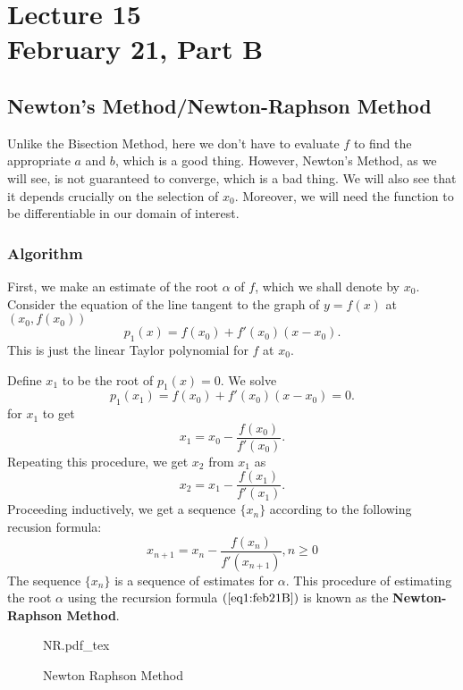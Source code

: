 \chapter*{Lecture 15 \\ February 21, Part B}
\setcounter{chapter}{15}
\setcounter{section}{0}
\setcounter{figure}{0}

\section{Newton's Method/Newton-Raphson Method}

Unlike the Bisection Method, here we don't have to evaluate $f$ to find the appropriate  $a$ and  $b$, which is a good thing. However, Newton's Method, as we will see, is not guaranteed to converge, which is a bad thing. We will also see that it depends crucially on the selection of $x_0$. Moreover, we will need the function to be differentiable in our domain of interest.

\subsection{Algorithm}
First, we make an estimate of the root $\alpha$ of $f$, which we shall denote by  $ x_0$.
Consider the equation of the line tangent to the graph of $y = f(x)$ at $(x_0, f(x_0))$
\[
p_1(x) = f(x_0) + f'(x_0)\left( x-x_0 \right)   
.\] 
This is just the linear Taylor polynomial for $f$ at  $ x_0$.

Define $ x_1$ to be the root of $ p_1(x) = 0$. We solve 
\[
p_1(x_1) = f(x_0) + f'(x_0)(x-x_0) = 0
.\] 
for $ x_1$ to get 
\[
x_1 = x_0 - \frac{f(x_0)}{f'(x_0)}
.\] 
Repeating this procedure, we get $ x_2$ from $ x_1$ as 
\[
x_2 = x_1 - \frac{f(x_1)}{f'(x_1)}
.\] 
Proceeding inductively, we get a sequence $\{x_n\}$ according to the following recusion formula:
\begin{equation}\label{eq1:feb21B}
	 x_{n+1} = x_n - \frac{f(x_n)}{f'(x_{n+1})}, n \geq 0
\end{equation}
The sequence $\{x_n\}$ is a sequence of estimates for  $\alpha$. This procedure of estimating the root $\alpha$ using the recursion formula $\left( \ref{eq1:feb21B} \right) $ is known as the \textbf{Newton-Raphson Method}.
\newpage

\begin{figure}[H]
	\centering
	\def\svgwidth{0.8\textwidth}
	{NR.pdf_tex}
	\caption{Newton Raphson Method}
	\label{fig1:feb21B}
\end{figure}


